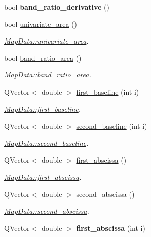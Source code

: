 \begin{DoxyCompactItemize}
\item 
bool {\bfseries band\+\_\+ratio\+\_\+derivative} ()\hypertarget{class_map_data_add65dd9c3866269d3604e9d409e905a8}{}\label{class_map_data_add65dd9c3866269d3604e9d409e905a8}

\item 
bool \hyperlink{class_map_data_a431880bb19b6845d2e9315306c0af0a2}{univariate\+\_\+area} ()
\begin{DoxyCompactList}\small\item\em \hyperlink{class_map_data_a431880bb19b6845d2e9315306c0af0a2}{Map\+Data\+::univariate\+\_\+area}. \end{DoxyCompactList}\item 
bool \hyperlink{class_map_data_a5ac3afb97da8c1b45e698db88d604974}{band\+\_\+ratio\+\_\+area} ()
\begin{DoxyCompactList}\small\item\em \hyperlink{class_map_data_a5ac3afb97da8c1b45e698db88d604974}{Map\+Data\+::band\+\_\+ratio\+\_\+area}. \end{DoxyCompactList}\item 
Q\+Vector$<$ double $>$ \hyperlink{class_map_data_a02dfe98d659e8eac8bf8eec4c376223f}{first\+\_\+baseline} (int i)
\begin{DoxyCompactList}\small\item\em \hyperlink{class_map_data_a02dfe98d659e8eac8bf8eec4c376223f}{Map\+Data\+::first\+\_\+baseline}. \end{DoxyCompactList}\item 
Q\+Vector$<$ double $>$ \hyperlink{class_map_data_afd3efd4d5aad351c03f2a68d62deaa4a}{second\+\_\+baseline} (int i)
\begin{DoxyCompactList}\small\item\em \hyperlink{class_map_data_afd3efd4d5aad351c03f2a68d62deaa4a}{Map\+Data\+::second\+\_\+baseline}. \end{DoxyCompactList}\item 
Q\+Vector$<$ double $>$ \hyperlink{class_map_data_a6c73650238e622489f4ba5ae580e0c84}{first\+\_\+abscissa} ()
\begin{DoxyCompactList}\small\item\em \hyperlink{class_map_data_a6c73650238e622489f4ba5ae580e0c84}{Map\+Data\+::first\+\_\+abscissa}. \end{DoxyCompactList}\item 
Q\+Vector$<$ double $>$ \hyperlink{class_map_data_a16fba2ab43dd4480662a2a1d76611352}{second\+\_\+abscissa} ()
\begin{DoxyCompactList}\small\item\em \hyperlink{class_map_data_a16fba2ab43dd4480662a2a1d76611352}{Map\+Data\+::second\+\_\+abscissa}. \end{DoxyCompactList}\item 
Q\+Vector$<$ double $>$ {\bfseries first\+\_\+abscissa} (int i)\hypertarget{class_map_data_a936b4e823ac91b7d48e456ba25abe87d}{}\label{class_map_data_a936b4e823ac91b7d48e456ba25abe87d}


\end{DoxyCompactItemize}
